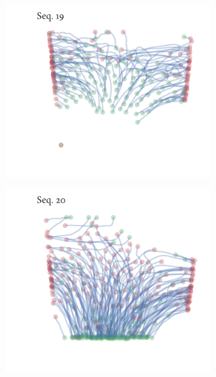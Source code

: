 \begin{figure}[h]
	\begin{subfigure}[t]{0.5\textwidth}
		\centering
		\includegraphics{streamline_sequence19.pdf}
	\end{subfigure}%
	\begin{subfigure}[t]{0.5\textwidth}
		\centering
		\includegraphics{streamline_sequence20.pdf}
	\end{subfigure}
	\begin{subfigure}[t]{0.5\textwidth}
		\centering

\end{subfigure}
\end{figure}
